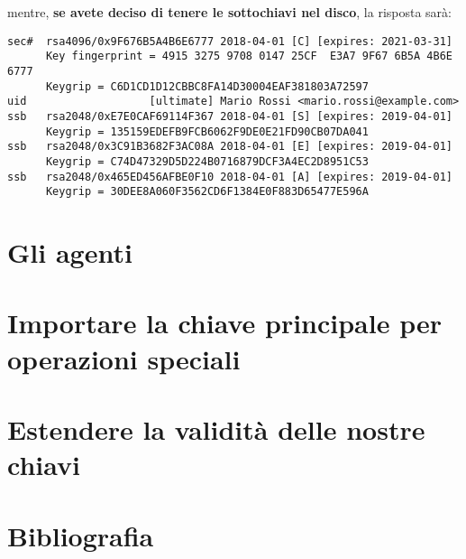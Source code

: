 \documentclass[a4paper,10pt]{article}
\begin{document}
mentre, \textbf{se avete deciso di tenere le sottochiavi nel disco}, la risposta sarà:

\begin{lstlisting}
sec#  rsa4096/0x9F676B5A4B6E6777 2018-04-01 [C] [expires: 2021-03-31]
      Key fingerprint = 4915 3275 9708 0147 25CF  E3A7 9F67 6B5A 4B6E 6777
      Keygrip = C6D1CD1D12CBBC8FA14D30004EAF381803A72597
uid                   [ultimate] Mario Rossi <mario.rossi@example.com>
ssb   rsa2048/0xE7E0CAF69114F367 2018-04-01 [S] [expires: 2019-04-01]
      Keygrip = 135159EDEFB9FCB6062F9DE0E21FD90CB07DA041
ssb   rsa2048/0x3C91B3682F3AC08A 2018-04-01 [E] [expires: 2019-04-01]
      Keygrip = C74D47329D5D224B0716879DCF3A4EC2D8951C53
ssb   rsa2048/0x465ED456AFBE0F10 2018-04-01 [A] [expires: 2019-04-01]
      Keygrip = 30DEE8A060F3562CD6F1384E0F883D65477E596A
\end{lstlisting}

\section{Gli agenti}

\section{Importare la chiave principale per operazioni speciali}

\section{Estendere la validità delle nostre chiavi}

\section{Bibliografia}
\end{document}
